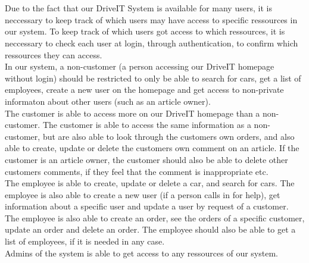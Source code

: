 \\\\
Due to the fact that our DriveIT System is available for many users, it is neccessary to keep track of which users may have access to specific ressources in our system. To keep track of which users got access to which ressources, it is neccessary to check each user at login, through authentication, to confirm which ressources they can access.\\

In our system, a non-customer (a person accessing our DriveIT homepage without login) should be restricted to only be able to search for cars, get a list of employees, create a new user on the homepage and get access to non-private informaton about other users (such as an article owner).\\

The customer is able to access more on our DriveIT homepage than a non-customer. The customer is able to access the same information as a non-customer, but are also able to look through the customers own orders, and also able to create, update or delete the customers own comment on an article. If the customer is an article owner, the customer should also be able to delete other customers comments, if they feel that the comment is inappropriate etc.\\

The employee is able to create, update or delete a car, and search for cars. The employee is also able to create a new user (if a person calls in for help), get information about a specific user and update a user by request of a customer. The employee is also able to create an order, see the orders of a specific customer, update an order and delete an order. The employee should also be able to get a list of employees, if it is needed in any case.\\

Admins of the system is able to get access to any ressources of our system.